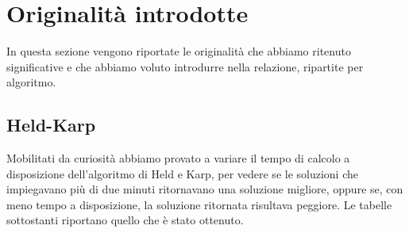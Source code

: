 \section{Originalità introdotte}
In questa sezione vengono riportate le originalità che abbiamo ritenuto significative e che abbiamo voluto introdurre nella relazione, ripartite per algoritmo.

\subsection{Held-Karp}
Mobilitati da curiosità abbiamo provato a variare il tempo di calcolo a disposizione dell'algoritmo di Held e Karp, per vedere se le soluzioni che impiegavano più di due minuti ritornavano una soluzione migliore, oppure se, con meno tempo a disposizione, la soluzione ritornata risultava peggiore. Le tabelle sottostanti riportano quello che è stato ottenuto.

